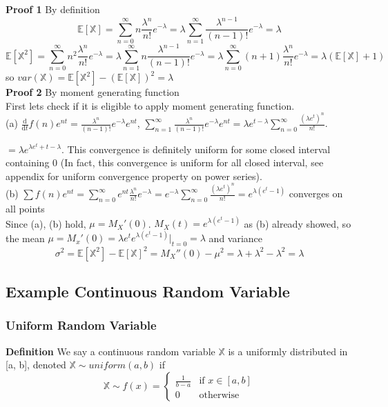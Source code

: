 \documentclass[a4paper,12pt]{article}
\begin{document}
\textbf{Proof 1} By definition
$$\mathbb{E}[\mathbb{X}] = \sum_{n=0}^\infty n\frac{\lambda^n}{n!}e^{-\lambda} = \lambda \sum_{n=1}^\infty \frac{\lambda^{n-1}}{(n-1)!}e^{-\lambda} = \lambda$$
$$\mathbb{E}[\mathbb{X}^2] = \sum_{n=0}^\infty n^2\frac{\lambda^n}{n!}e^{-\lambda} = \lambda \sum_{n=1}^\infty n  \frac{\lambda^{n-1}}{(n-1)!}e^{-\lambda} =  \lambda \sum_{n=0}^\infty (n+1)  \frac{\lambda^{n}}{n!}e^{-\lambda} = \lambda (\mathbb{E}[\mathbb{X}] + 1)$$
so $var(\mathbb{X}) = \mathbb{E}[\mathbb{X}^2] - (\mathbb{E}[\mathbb{X}])^2 = \lambda$\\

\textbf{Proof 2} By moment generating function\\

First lets check if it is eligible to apply moment generating function.\\
(a) $\frac{\mathrm{d}}{\mathrm{d}t} f(n)e^{nt} = \frac{\lambda^n}{(n-1)!}e^{-\lambda}e^{nt}$, $\sum_{n=1}^\infty \frac{\lambda^n}{(n-1)!}e^{-\lambda}e^{nt} = \lambda e^{t-\lambda} \sum_{n=0}^\infty \frac{(\lambda e^t)^n}{n!}$. 

$= \lambda e^{\lambda e^t + t - \lambda}$. This convergence is definitely uniform for some closed interval containing $0$ (In fact, this convergence is uniform for all closed interval, see appendix for uniform convergence property on power series).\\
(b) $\sum f(n)e^{nt} = \sum_{n=0}^\infty e^{nt}  \frac{\lambda^n}{n!}e^{-\lambda} = e^{-\lambda} \sum_{n=0}^\infty \frac{ (\lambda e^t)^n}{n!} = e^{\lambda (e^t - 1)}$ converges on all points\\

Since (a), (b) hold, $\mu = M_X'(0)$. $M_X(t) = e^{\lambda (e^t - 1)}$ as (b) already showed, so the mean
$ \mu = M_x'(0) = \lambda e^t e^{\lambda (e^t - 1)} |_{t=0} = \lambda $
and variance
$$\sigma^2 = \mathbb{E}[\mathbb{X}^2] - \mathbb{E}[\mathbb{X}]^2 = M_X''(0) - \mu^2 = \lambda + \lambda^2 - \lambda^2 = \lambda$$

\subsection{Example Continuous Random Variable}
\subsubsection{Uniform Random Variable}
\textbf{Definition} We say a continuous random variable $\mathbb{X}$ is a uniformly distributed in [a, b], denoted $\mathbb{X} \sim uniform(a, b)$ if
$$
 \mathbb{X} \sim f(x) =
  \begin{cases}
   \frac{1}{b-a} & \text{if } x \in [a, b] \\
   0       & \text{otherwise}
  \end{cases}
$$\\
\end{document}
